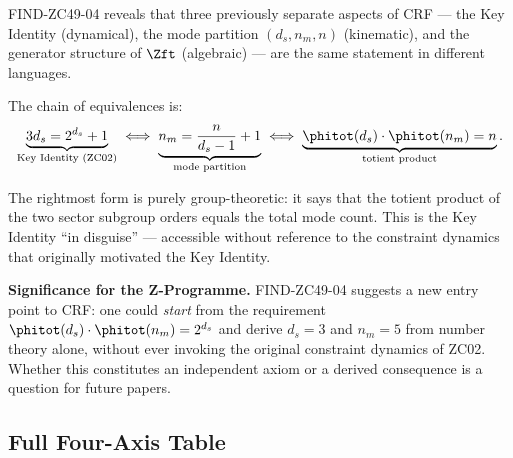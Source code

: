 \documentclass[12pt, a4paper]{article}
\begin{document}
\begin{derivedbox}[title={Commentary on FIND-ZC49-04}]
FIND-ZC49-04 reveals that three previously separate aspects
of CRF --- the Key Identity (dynamical), the mode partition
$(d_s, n_m, n)$ (kinematic), and the generator structure
of $\Zft$ (algebraic) --- are the same statement in different
languages.

The chain of equivalences is:
\[
  \underbrace{3d_s = 2^{d_s}+1}_{\text{Key Identity (ZC02)}}
  \;\Longleftrightarrow\;
  \underbrace{n_m = \frac{n}{d_s-1}+1}_{\text{mode partition}}
  \;\Longleftrightarrow\;
  \underbrace{\phitot(d_s)\cdot\phitot(n_m) = n}_{\text{totient product}}.
\]

The rightmost form is purely group-theoretic: it says that
the totient product of the two sector subgroup orders equals
the total mode count.
This is the Key Identity ``in disguise'' --- accessible
without reference to the constraint dynamics that originally
motivated the Key Identity.

\textbf{Significance for the Z-Programme.}
FIND-ZC49-04 suggests a new entry point to CRF:
one could \emph{start} from the requirement
$\phitot(d_s)\cdot\phitot(n_m) = 2^{d_s}$
and derive $d_s = 3$ and $n_m = 5$ from number theory
alone, without ever invoking the original constraint
dynamics of ZC02.
Whether this constitutes an independent axiom or a
derived consequence is a question for future papers.
\end{derivedbox}

\subsection{Full Four-Axis Table}
\label{sec:table}
\end{document}
